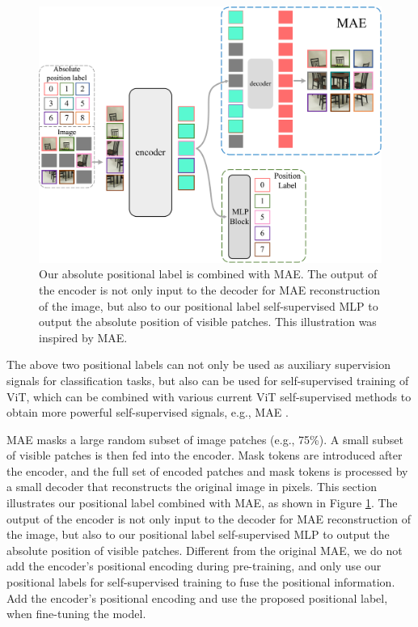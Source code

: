 \documentclass{article}
\begin{document}
\begin{figure}[h]
  \centering
   \includegraphics[width=1.0\linewidth]{CombineMAE.pdf}

   \caption{Our absolute positional label is combined with MAE. The output of the encoder is not only input to the decoder for MAE reconstruction of the image, but also to our positional label self-supervised MLP to output the absolute position of visible patches. This illustration was inspired by MAE.}
   \label{CombineMAE-flabel}
\end{figure}

The above two positional labels can not only be used as auxiliary supervision signals for classification tasks, but also can be used for self-supervised training of ViT, which can be combined with various current ViT self-supervised methods to obtain more powerful self-supervised signals, e.g., MAE \cite{DBLP:journals/corr/abs-2111-06377}. 

MAE masks a large random subset of image patches (e.g., 75\%). A small subset of visible patches is then fed into the encoder. Mask tokens are introduced after the encoder, and the full set of encoded patches and mask tokens is processed by a small decoder that reconstructs the original image in pixels. This section illustrates our positional label combined with MAE, as shown in Figure \ref{CombineMAE-flabel}. The output of the encoder is not only input to the decoder for MAE reconstruction of the image, but also to our positional label self-supervised MLP to output the absolute position of visible patches. Different from the original MAE, we do not add the encoder's positional encoding during pre-training, and only use our positional labels for self-supervised training to fuse the positional information. Add the encoder's positional encoding and use the proposed positional label, when fine-tuning the model.
\end{document}
